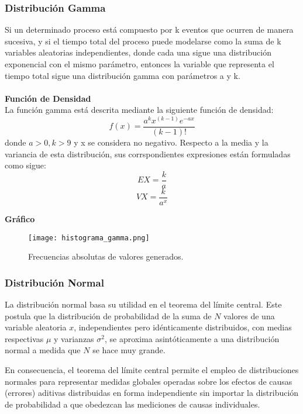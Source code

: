 \documentclass[11pt]{article}
\begin{document}
\subsubsection{Distribución Gamma}
Si un determinado proceso está compuesto por k eventos que ocurren de manera sucesiva, y si el tiempo total del proceso puede modelarse como la suma de k variables aleatorias independientes, donde cada una sigue una distribución exponencial con el mismo parámetro, entonces la variable que representa el tiempo total sigue una distribución gamma con parámetros a y k. \\
\\
\noindent\textbf{Función de Densidad}\\
La función gamma está descrita mediante la siguiente función de densidad:
  \begin{equation}
    f(x) = \frac{a^{k}x^{(k-1)}e^{-ax}}{(k-1)!}
  \end{equation}
  donde $a > 0  ,  k > 9$ y x se considera no negativo.
  Respecto a la media y la variancia de esta distribución, sus corrspondientes expresiones están formuladas como sigue:
  \begin{equation}
    EX = \frac{k}{a}
  \end{equation}
  \begin{equation}
    VX = \frac{k}{a^{x}}
  \end{equation}

\newpage
\noindent\textbf{Gráfico}\\
\begin{figure}[h]
    \centering
    \texttt{[image: histograma\_gamma.png]}
    \caption{Frecuencias absolutas de valores generados.}
  \end{figure}

\subsubsection{Distribución Normal}
La distribución normal basa su utilidad en el teorema del límite central. Este postula que la distribución de probabilidad de la suma de \( N \) valores de una variable aleatoria \( x \), independientes pero idénticamente distribuidos, con medias respectivas \( \mu \) y varianzas \( \sigma^2 \), se aproxima asintóticamente a una distribución normal a medida que \( N \) se hace muy grande.


En consecuencia, el teorema del límite central permite el empleo de distribuciones normales para representar medidas globales operadas sobre los efectos de causas (errores) aditivas distribuidas en forma independiente sin importar la distribución de probabilidad a que obedezcan las mediciones de causas individuales. 
\end{document}
